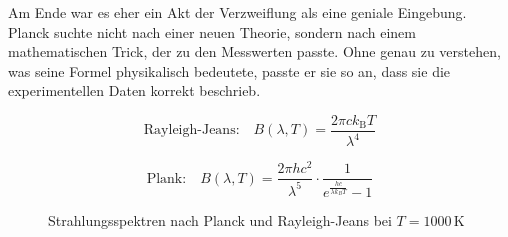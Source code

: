 	
	Am Ende war es eher ein Akt der Verzweiflung als eine geniale Eingebung. 
	Planck suchte nicht nach einer neuen Theorie, sondern nach einem mathematischen Trick, der zu den Messwerten passte.
	Ohne genau zu verstehen, was seine Formel physikalisch bedeutete, passte er sie so an, dass sie die experimentellen Daten korrekt beschrieb.


	\begin{equation}
		\text{Rayleigh-Jeans:} \quad B(\lambda, T) = \frac{2 \pi c k_\mathrm{B} T}{\lambda^4}
	\end{equation}

	\begin{equation}
		\text{Plank:} \quad B(\lambda, T) = \frac{2 \pi h c^2}{\lambda^5} \cdot \frac{1}{e^{\frac{h c}{\lambda k_B T}} - 1}
	\end{equation}
	


		
	\begin{figure}[htbp]
		\centering
		\caption{Strahlungsspektren nach Planck und Rayleigh-Jeans bei $T=1000\,\mathrm{K}$}
	\end{figure}
		

